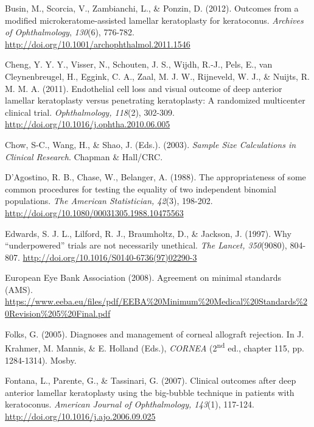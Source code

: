 \documentclass[authordate, empirical]{jote-new-article}
\begin{document}
	Busin, M., Scorcia, V., Zambianchi, L., \& Ponzin, D. (2012). Outcomes from a modified microkeratome-assisted lamellar keratoplasty for keratoconus. \emph{Archives of Ophthalmology}, \emph{130}(6), 776-782. \url{http://doi.org/10.1001/archophthalmol.2011.1546}



	Cheng, Y. Y. Y., Visser, N., Schouten, J. S., Wijdh, R.-J., Pels, E., van Cleynenbreugel, H., Eggink, C. A., Zaal, M. J. W., Rijneveld, W. J., \& Nuijts, R. M. M. A. (2011). Endothelial cell loss and visual outcome of deep anterior lamellar keratoplasty versus penetrating keratoplasty: A randomized multicenter clinical trial. \emph{Ophthalmology, 118}(2), 302-309. \url{http://doi.org/10.1016/j.ophtha.2010.06.005}



	Chow, S-C., Wang, H., \& Shao, J. (Eds.). (2003). \emph{Sample Size Calculations in Clinical Research}. Chapman \& Hall/CRC.



	D'Agostino, R. B., Chase, W., Belanger, A. (1988). The appropriateness of some common procedures for testing the equality of two independent binomial populations. \emph{The American Statistician, 42}(3), 198-202. \url{http://doi.org/10.1080/00031305.1988.10475563}



	Edwards, S. J. L., Lilford, R. J., Braumholtz, D., \& Jackson, J. (1997). Why “underpowered” trials are not necessarily unethical. \emph{The Lancet, 350}(9080), 804-807. \url{http://doi.org/10.1016/S0140-6736(97)02290-3}



	European Eye Bank Association (2008). Agreement on minimal standards (AMS). \url{https://www.eeba.eu/files/pdf/EEBA%20Minimum%20Medical%20Standards%20Revision%205%20Final.pdf}



	Folks, G. (2005). Diagnoses and management of corneal allograft rejection. In J. Krahmer, M. Mannis, \& E. Holland (Eds.), \emph{CORNEA }(2\textsuperscript{nd} ed., chapter 115, pp. 1284-1314). Mosby.



	Fontana, L., Parente, G., \& Tassinari, G. (2007). Clinical outcomes after deep anterior lamellar keratoplasty using the big-bubble technique in patients with keratoconus. \emph{American Journal of Ophthalmology, 143}(1), 117-124. \url{http://doi.org/10.1016/j.ajo.2006.09.025}
\end{document}
